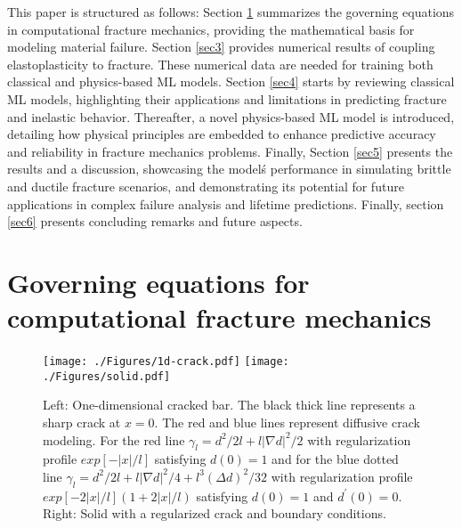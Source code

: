 \documentclass[final,3p,times]{elsarticle}
\begin{document}
This paper is structured as follows: Section \ref{sec2} summarizes the governing equations in computational fracture mechanics, providing the mathematical basis for modeling material failure. Section \ref{sec3} provides numerical results of coupling elastoplasticity to fracture. These numerical data are needed for training both classical and physics-based ML models. Section \ref{sec4} starts by reviewing classical ML models, highlighting their applications and limitations in predicting fracture and inelastic behavior. Thereafter, a novel physics-based ML model is introduced, detailing how physical principles are embedded to enhance predictive accuracy and reliability in fracture mechanics problems. Finally, Section \ref{sec5} presents the results and a discussion, showcasing the model\'s performance in simulating brittle and ductile fracture scenarios, and demonstrating its potential for future applications in complex failure analysis and lifetime predictions. Finally, section \ref{sec6} presents concluding remarks and future aspects.



\section{Governing equations for computational fracture mechanics}
\label{sec2}
%
\begin{figure}[b]%
\centering
%
\texttt{[image: ./Figures/1d-crack.pdf]} \qquad
\texttt{[image: ./Figures/solid.pdf]}
%
\caption{
Left: One-dimensional cracked bar. The black thick line represents a sharp crack at $x=0$. The red and blue lines represent diffusive crack modeling. For the red line $\gamma_l=
d^2/2l + l\vert \nabla d \vert^2/2$ with regularization profile
$exp[ - \vert x \vert /l ]$ satisfying $d(0)=1$ and for the blue dotted line
$\gamma_l = d^2/2l + l |\nabla d|^2/4 + l^3(\Delta d)^2/32$ with
regularization profile $exp[ - 2\vert x \vert /l ] (1+ 2\vert x \vert
/l)$ satisfying $d(0)=1$ and $d^{\prime}(0)=0$. 
Right: Solid with a regularized crack and boundary conditions.}
\label{solid-FE}%
\end{figure}%
%
\end{document}
